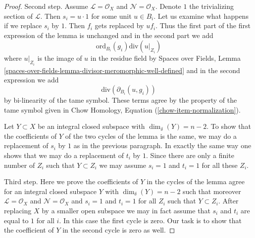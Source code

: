 \begin{proof}
\medskip\noindent
Second step. Assume $\mathcal{L} = \mathcal{O}_X$ and
$\mathcal{N} = \mathcal{O}_X$. Denote $1$ the trivializing
section of $\mathcal{L}$. Then $s_i = u \cdot 1$
for some unit $u \in B_i$. Let us examine what happens
if we replace $s_i$ by $1$. Then $f_i$ gets replaced by $u f_i$.
Thus the first part of the first expression of the lemma is unchanged
and in the second part we add
$$
\text{ord}_{B_i}(g_i)\text{div}(u|_{Z_i})
$$
where $u|_{Z_i}$ is the image of $u$ in the residue field by
Spaces over Fields, Lemma
\ref{spaces-over-fields-lemma-divisor-meromorphic-well-defined}
and in the second expression we add
$$
\text{div}(\partial_{B_i}(u, g_i))
$$
by bi-linearity of the tame symbol. These terms agree by the property
of the tame symbol given in
Chow Homology, Equation (\ref{chow-item-normalization}).

\medskip\noindent
Let $Y \subset X$ be an integral closed subspace with $\dim_\delta(Y) = n - 2$.
To show that the coefficients of $Y$ of the two cycles of the lemma
is the same, we may do a replacement of $s_i$ by $1$ as in the previous
paragraph. In exactly the same way one shows that we may do a replacement
of $t_i$ by $1$. Since there are only a finite number of $Z_i$
such that $Y \subset Z_i$ we may assume $s_i = 1$ and $t_i = 1$
for all these $Z_i$.

\medskip\noindent
Third step. Here we prove the coefficients of $Y$ in the cycles
of the lemma agree for an integral closed subspace $Y$ with
$\dim_\delta(Y) = n - 2$ such that moreover
$\mathcal{L} = \mathcal{O}_X$ and $\mathcal{N} = \mathcal{O}_X$
and $s_i = 1$ and $t_i = 1$ for all $Z_i$ such that $Y \subset Z_i$.
After replacing $X$ by a smaller open subspace we may
in fact assume that $s_i$ and $t_i$ are equal to $1$ for all $i$.
In this case the first cycle is zero. Our task is to show that
the coefficient of $Y$ in the second cycle is zero as well.


\end{proof}
